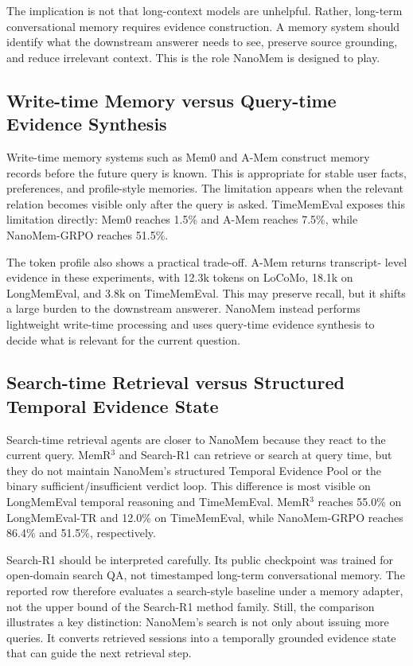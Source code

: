 The implication is not that long-context models are unhelpful. Rather,
long-term conversational memory requires evidence construction. A memory system
should identify what the downstream answerer needs to see, preserve source
grounding, and reduce irrelevant context. This is the role NanoMem is designed
to play.

\subsection{Write-time Memory versus Query-time Evidence Synthesis}
\label{subsec:analysis-write-time}

Write-time memory systems such as Mem0 and A-Mem construct memory records before
the future query is known. This is appropriate for stable user facts,
preferences, and profile-style memories. The limitation appears when the
relevant relation becomes visible only after the query is asked. TimeMemEval
exposes this limitation directly: Mem0 reaches 1.5\% and A-Mem reaches 7.5\%,
while NanoMem-GRPO reaches 51.5\%.

The token profile also shows a practical trade-off. A-Mem returns transcript-
level evidence in these experiments, with 12.3k tokens on LoCoMo, 18.1k on
LongMemEval, and 3.8k on TimeMemEval. This may preserve recall, but it shifts a
large burden to the downstream answerer. NanoMem instead performs lightweight
write-time processing and uses query-time evidence synthesis to decide what is
relevant for the current question.

\subsection{Search-time Retrieval versus Structured Temporal Evidence State}
\label{subsec:analysis-search-time}

Search-time retrieval agents are closer to NanoMem because they react to the
current query. MemR$^3$ and Search-R1 can retrieve or search at query time, but
they do not maintain NanoMem's structured Temporal Evidence Pool or the binary
sufficient/insufficient verdict loop. This difference is most visible on
LongMemEval temporal reasoning and TimeMemEval. MemR$^3$ reaches 55.0\% on
LongMemEval-TR and 12.0\% on TimeMemEval, while NanoMem-GRPO reaches 86.4\%
and 51.5\%, respectively.

Search-R1 should be interpreted carefully. Its public checkpoint was trained for
open-domain search QA, not timestamped long-term conversational memory. The
reported row therefore evaluates a search-style baseline under a memory adapter,
not the upper bound of the Search-R1 method family. Still, the comparison
illustrates a key distinction: NanoMem's search is not only about issuing more
queries. It converts retrieved sessions into a temporally grounded evidence
state that can guide the next retrieval step.


